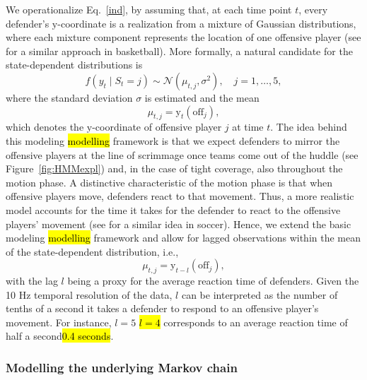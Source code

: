 \documentclass[namedate,webpdf,modern,medium]{oup-authoring-template}
\providecommand{\DIFadd}[1]{\ifmmode{#1}\else\hl{#1}\fi} %
\providecommand{\DIFdel}[1]{{\protect\color{red}#1}} %
\providecommand{\DIFaddbegin}{} %
\providecommand{\DIFaddend}{} %
\providecommand{\DIFdelbegin}{} %
\providecommand{\DIFdelend}{} %
\begin{document}
We operationalize Eq.~\ref{ind}, by assuming that, at each time point $t$, every defender's $\mathrm{y}$-coordinate is a realization from a mixture of Gaussian distributions, where each mixture component represents the location of one offensive player (see \citealp{franks2015} for a similar approach in basketball). 
More formally, a natural candidate for the state-dependent distributions is
\begin{equation}
\label{eqn:state_dep}
  f(y_t \mid S_t = j) \sim \mathcal{N}(\mu_{t,j}, \sigma^2), \quad j = 1, \ldots, 5,  
\end{equation}
where the standard deviation $\sigma$ is estimated and the mean
$$\mu_{t,j} = \mathrm{y}_t(\text{off}_j),$$ 
which denotes the $\mathrm{y}$-coordinate of offensive player $j$ at time $t$. The idea behind this \DIFdelbegin \DIFdel{modeling }\DIFdelend \DIFaddbegin \DIFadd{modelling }\DIFaddend framework is that we expect defenders to mirror the offensive players at the line of scrimmage once teams come out of the huddle (see Figure~\ref{fig:HMMexpl}) and, in the case of tight coverage, also throughout the motion phase. 
A distinctive characteristic of the motion phase is that when offensive players move, defenders react to that movement. Thus, a more realistic model accounts for the time it takes for the defender to react to the offensive players' movement (see \citealp{wu2023evaluation} for a similar idea in soccer). Hence, we extend the basic \DIFdelbegin \DIFdel{modeling }\DIFdelend \DIFaddbegin \DIFadd{modelling }\DIFaddend framework and allow for lagged observations within the mean of the state-dependent distribution, i.e., 
\begin{equation}\label{eq:lag}    
\mu_{t,j} = \mathrm{y}_{t-l}(\text{off}_j),
\end{equation}
with the lag $l$ being a proxy for the average reaction time of defenders. 
Given the 10 Hz temporal resolution of the data, $l$ can be interpreted as the number of tenths of a second it takes a defender to respond to an offensive player’s movement. For instance, \DIFdelbegin \DIFdel{\mbox{$l = 5$} }\DIFdelend \DIFaddbegin \DIFadd{\mbox{$l = 4$} }\DIFaddend corresponds to an average reaction time of \DIFdelbegin \DIFdel{half a second}\DIFdelend \DIFaddbegin \DIFadd{0.4 seconds}\DIFaddend .

\DIFdelbegin %
\DIFdelend \DIFaddbegin \subsubsection{Modelling the underlying Markov chain}
\DIFaddend \label{sec:MC_dets}
\end{document}

